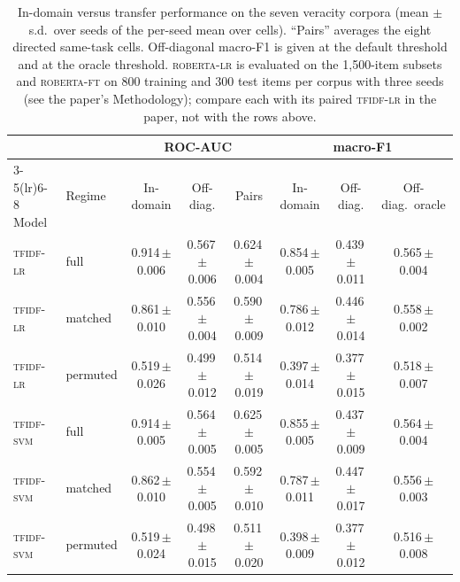 \begin{table}[t]
\centering
\caption{In-domain versus transfer performance on the seven veracity corpora (mean $\pm$ s.d.\ over seeds of the per-seed mean over cells). ``Pairs'' averages the eight directed same-task cells. Off-diagonal macro-F1 is given at the default threshold and at the oracle threshold. \textsc{roberta-lr} is evaluated on the 1{,}500-item subsets and \textsc{roberta-ft} on 800 training and 300 test items per corpus with three seeds (see the paper's Methodology); compare each with its paired \textsc{tfidf-lr} in the paper, not with the rows above.}\label{tab:headline}
\small
\setlength{\tabcolsep}{4pt}
\begin{tabular}{@{}llcccccc@{}}
\toprule
 & & \multicolumn{3}{c}{ROC-AUC} & \multicolumn{3}{c}{macro-F1} \\
\cmidrule(lr){3-5}\cmidrule(lr){6-8}
Model & Regime & In-domain & Off-diag. & Pairs & In-domain & Off-diag. & Off-diag.\ oracle \\
\midrule
\textsc{tfidf-lr} & full & 0.914\,{\scriptsize$\pm$0.006} & 0.567\,{\scriptsize$\pm$0.006} & 0.624\,{\scriptsize$\pm$0.004} & 0.854\,{\scriptsize$\pm$0.005} & 0.439\,{\scriptsize$\pm$0.011} & 0.565\,{\scriptsize$\pm$0.004} \\
\textsc{tfidf-lr} & matched & 0.861\,{\scriptsize$\pm$0.010} & 0.556\,{\scriptsize$\pm$0.004} & 0.590\,{\scriptsize$\pm$0.009} & 0.786\,{\scriptsize$\pm$0.012} & 0.446\,{\scriptsize$\pm$0.014} & 0.558\,{\scriptsize$\pm$0.002} \\
\textsc{tfidf-lr} & permuted & 0.519\,{\scriptsize$\pm$0.026} & 0.499\,{\scriptsize$\pm$0.012} & 0.514\,{\scriptsize$\pm$0.019} & 0.397\,{\scriptsize$\pm$0.014} & 0.377\,{\scriptsize$\pm$0.015} & 0.518\,{\scriptsize$\pm$0.007} \\
\addlinespace
\textsc{tfidf-svm} & full & 0.914\,{\scriptsize$\pm$0.005} & 0.564\,{\scriptsize$\pm$0.005} & 0.625\,{\scriptsize$\pm$0.005} & 0.855\,{\scriptsize$\pm$0.005} & 0.437\,{\scriptsize$\pm$0.009} & 0.564\,{\scriptsize$\pm$0.004} \\
\textsc{tfidf-svm} & matched & 0.862\,{\scriptsize$\pm$0.010} & 0.554\,{\scriptsize$\pm$0.005} & 0.592\,{\scriptsize$\pm$0.010} & 0.787\,{\scriptsize$\pm$0.011} & 0.447\,{\scriptsize$\pm$0.017} & 0.556\,{\scriptsize$\pm$0.003} \\
\textsc{tfidf-svm} & permuted & 0.519\,{\scriptsize$\pm$0.024} & 0.498\,{\scriptsize$\pm$0.015} & 0.511\,{\scriptsize$\pm$0.020} & 0.398\,{\scriptsize$\pm$0.009} & 0.377\,{\scriptsize$\pm$0.012} & 0.516\,{\scriptsize$\pm$0.008} \\

\end{tabular}
\end{table}
